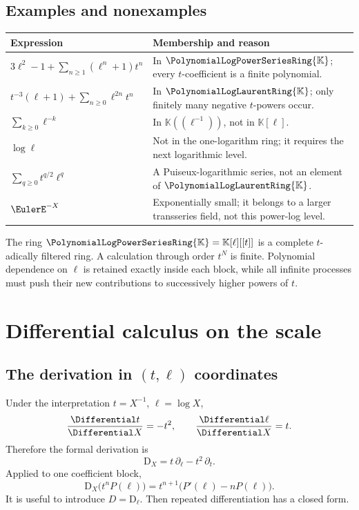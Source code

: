 \documentclass[11pt,oneside,openany]{book}
\newcommand{\K}{\mathbb{K}}
\newcommand{\Rring}{\PolynomialLogPowerSeriesRing{\K}}
\newcommand{\Pring}{\PolynomialLogLaurentRing{\K}}
\newcommand{\D}{\mathrm{D}}
\begin{document}
\section{Examples and nonexamples}
\begin{center}
\begin{tabularx}{0.94\textwidth}{@{}>{\raggedright\arraybackslash}p{}X@{}}
\toprule
Expression & Membership and reason \\
\midrule
\(\displaystyle 3\ell^2-1+\sum_{n\geq1}(\ell^n+1)t^n\)
& In \(\Rring\); every \(t\)-coefficient is a finite polynomial. \\
\(\displaystyle t^{-3}(\ell+1)+\sum_{n\geq0}\ell^{2n}t^n\)
& In \(\Pring\); only finitely many negative \(t\)-powers occur. \\
\(\displaystyle \sum_{k\geq0}\ell^{-k}\)
& In \(\K((\ell^{-1}))\), not in \(\K[\ell]\). \\
\(\displaystyle \log\ell\)
& Not in the one-logarithm ring; it requires the next logarithmic level. \\
\(\displaystyle \sum_{q\geq0}t^{q/2}\ell^q\)
& A Puiseux-logarithmic series, not an element of \(\Pring\). \\
\(\displaystyle \EulerE^{-X}\)
& Exponentially small; it belongs to a larger transseries field, not this power-log level. \\
\bottomrule
\end{tabularx}
\end{center}

\begin{summarybox}
The ring \(\Rring=\K[\ell][[t]]\) is a complete \(t\)-adically filtered ring.
A calculation through order \(t^N\) is finite.  Polynomial dependence on
\(\ell\) is retained exactly inside each block, while all infinite processes
must push their new contributions to successively higher powers of \(t\).
\end{summarybox}

\chapter{Differential calculus on the scale}
\label{ch:differential}

\section{The derivation in \texorpdfstring{\((t,\ell)\)}{(t,l)} coordinates}
Under the interpretation \(t=X^{-1}\), \(\ell=\log X\),
\[
  \frac{\Differential t}{\Differential X}=-t^2,
  \qquad
  \frac{\Differential\ell}{\Differential X}=t.
\]
Therefore the formal derivation is
\begin{equation}\label{eq:DXoperator}
  \D_X=t\,\partial_\ell-t^2\,\partial_t.
\end{equation}
Applied to one coefficient block,
\begin{equation}\label{eq:blockderivative}
  \D_X\bigl(t^nP(\ell)\bigr)
  =t^{n+1}\bigl(P'(\ell)-nP(\ell)\bigr).
\end{equation}
It is useful to introduce \(D=\D_\ell\).  Then repeated differentiation has a
closed form.
\end{document}
